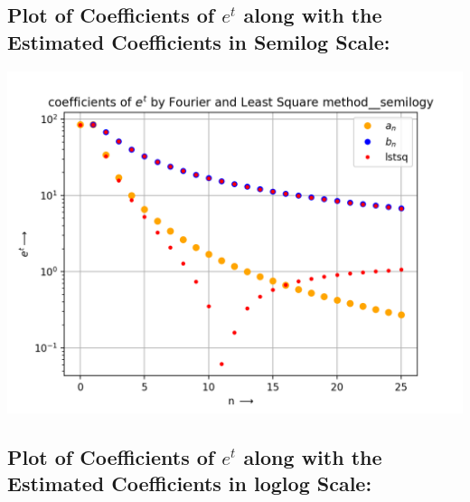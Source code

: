 \documentclass[10pt,english, openany]{book}
\begin{document}
\subsection{Plot of Coefficients of $e^t$ along with the Estimated Coefficients  in Semilog Scale:}
{\centering\includegraphics[scale=0.7]{Figure_3.png}}

\subsection{Plot of Coefficients of $e^t$ along with the Estimated Coefficients  in loglog Scale:}
\end{document}
